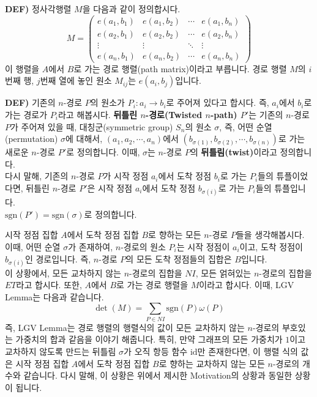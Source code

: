 \documentclass[a4paper]{article}
\begin{document}
\begin{mdframed}
\textbf{DEF)} 정사각행렬 $M$을 다음과 같이 정의합시다. $$M = \begin{pmatrix}e(a_1,b_1)&e(a_1,b_2)&\cdots&e(a_1, b_n)\\e(a_2, b_1)&e(a_2,b_2)&\cdots&e(a_2,b_n)\\
\vdots&\vdots&\ddots&\vdots\\e(a_n,b_1)&e(a_n,b_2)&\cdots&e(a_n,b_n)\end{pmatrix}$$
이 행렬을 $A$에서 $B$로 가는 경로 행렬(path matrix)이라고 부릅니다. 경로 행렬 $M$의 $i$번째 행, $j$번째 열에 놓인 원소 $M_{ij}$는 $e(a_i,b_j)$입니다.
\end{mdframed}

\begin{mdframed}
\textbf{DEF)} 기존의 $n$-경로 $P$의 원소가 $P_i : a_i \rightarrow b_i$로 주어져 있다고 합시다. 즉, $a_i$에서 $b_i$로 가는 경로가 $P_i$라고 해봅시다. \textbf{뒤틀린 $n$-경로(Twisted $n$-path) $P'$}는 기존의 $n$-경로 $P$가 주어져 있을 때, 대칭군(symmetric group) $S_n$의 원소 $\sigma$, 즉, 어떤 순열(permutation) $\sigma$에 대해서, $(a_1, a_2, \cdots, a_n)$에서 $(b_{\sigma(1)}, b_{\sigma(2)}, \cdots, b_{\sigma(n)})$로 가는 새로운 $n$-경로 $P'$로 정의합니다. 이때, $\sigma$는 $n$-경로 $P$의 \textbf{뒤틀림(twist)}이라고 정의합니다.\\
다시 말해, 기존의 $n$-경로 $P$가 시작 정점 $a_i$에서 도착 정점 $b_i$로 가는 $P_i$들의 튜플이었다면, 뒤틀린 $n$-경로 $P'$은 시작 정점 $a_i$에서 도착 정점 $b_{\sigma(i)}$로 가는 $P_i$들의 튜플입니다.\\
$\mathrm{sgn}(P') = \mathrm{sgn}(\sigma)$로 정의합니다. 
\end{mdframed}
시작 정점 집합 $A$에서 도착 정점 집합 $B$로 향하는 모든 $n$-경로 $P$들을 생각해봅시다. 이때, 어떤 순열 $\sigma$가 존재하여, $n$-경로의 원소 $P_i$는  시작 정점이 $a_i$이고, 도착 정점이 $b_{\sigma(i)}$인 경로입니다. 즉, $n$-경로 $P$의 모든 도착 정점들의 집합은 $B$입니다.\\
이 상황에서, 모든 교차하지 않는 $n$-경로의 집합을 $NI$, 모든 얽혀있는 $n$-경로의 집합을 $ET$라고 합시다. 또한, $A$에서 $B$로 가는 경로 행렬을 $M$이라고 합시다. 이때, LGV Lemma는 다음과 같습니다. $$\det(M) =  \sum_{P \in NI}\mathrm{sgn}(P)\omega(P)$$
즉, LGV Lemma는 경로 행렬의 행렬식의 값이 모든 교차하지 않는 $n$-경로의 부호있는 가중치의 합과 같음을 이야기 해줍니다. 특히, 만약 그래프의 모든 가중치가 $1$이고 교차하지 않도록 만드는 뒤틀림 $\sigma$가 오직 항등 함수 $\mathrm{id}$만 존재한다면, 이 행렬 식의 값은 시작 정점 집합 $A$에서 도착 정점 집합 $B$로 향하는 교차하지 않는 모든 $n$-경로의 개수와 같습니다. 다시 말해, 이 상황은 위에서 제시한 Motivation의 상황과 동일한 상황이 됩니다.\\
\end{document}
